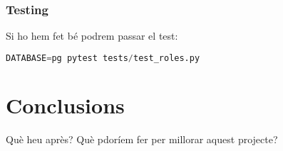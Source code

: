\documentclass[a4paper, 11pt]{article}
\begin{document}
\subsubsection{Testing}
Si ho hem fet bé podrem passar el test:
\begin{lstlisting}[language=Python, caption=Testing 7]
  DATABASE=pg pytest tests/test_roles.py
\end{lstlisting}

\section{Conclusions}
Què heu après? Què pdoríem fer per millorar aquest projecte?



\end{document}
